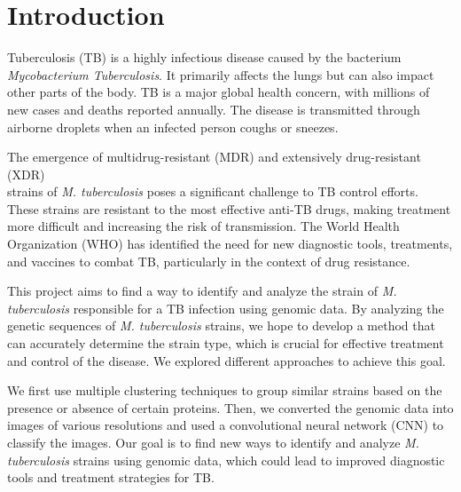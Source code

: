 \chapter{Introduction}
\label{chap:introduction}

Tuberculosis (TB) is a highly infectious disease caused by the bacterium \textit{Mycobacterium Tuberculosis}.
It primarily affects the lungs but can also impact other parts of the body. TB is a major global health concern,
with millions of new cases and deaths reported annually. The disease is transmitted through airborne droplets
when an infected person coughs or sneezes.

The emergence of multidrug-resistant (MDR) and extensively drug-resistant (XDR)\\strains of \textit{M. tuberculosis}
poses a significant challenge to TB control efforts. These strains are resistant to the most effective anti-TB drugs,
making treatment more difficult and increasing the risk of transmission. The World Health Organization (WHO) has
identified the need for new diagnostic tools, treatments, and vaccines to combat TB, particularly in the context of
drug resistance.

This project aims to find a way to identify and analyze the strain of \textit{M. tuberculosis} responsible for a TB infection
using genomic data. By analyzing the genetic sequences of \textit{M. tuberculosis} strains, we hope to develop a method that can
accurately determine the strain type, which is crucial for effective treatment and control of the disease. We explored
different approaches to achieve this goal.

We first use multiple clustering techniques to group similar strains based on the presence or absence of certain proteins.
Then, we converted the genomic data into images of various resolutions and used a convolutional neural network (CNN) to
classify the images. Our goal is to find new ways to identify and analyze \textit{M. tuberculosis} strains using genomic data,
which could lead to improved diagnostic tools and treatment strategies for TB.

